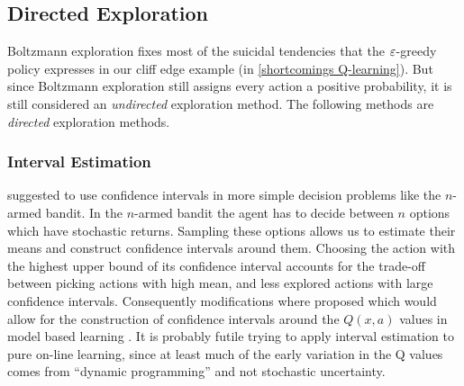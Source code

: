\subsection{Directed Exploration}

Boltzmann exploration fixes most of the suicidal tendencies that the \(\varepsilon\)-greedy policy expresses in our cliff edge example (in \ref{shortcomings Q-learning}). But since Boltzmann exploration still assigns every action a positive probability, it is still considered an \emph{undirected} exploration method. The following methods are \emph{directed} exploration methods.

\subsubsection{Interval Estimation}
\textcite{kaelblingLearningEmbeddedSystems1993} suggested to use confidence intervals in more simple decision problems like the \(n\)-armed bandit. 
In the \(n\)-armed bandit the agent has to decide between \(n\) options which have stochastic returns. Sampling these options allows us to estimate their means and construct confidence intervals around them. Choosing the action with the highest upper bound of its confidence interval accounts for the trade-off between picking actions with high mean, and less explored actions with large confidence intervals. Consequently modifications where proposed which would allow for the construction of confidence intervals around the \(Q(x,a)\) values in model based learning \parencite[e.g.][]{wieringEfficientModelbasedExploration1998,strehlAnalysisModelbasedInterval2008}. It is probably futile trying to apply interval estimation to pure on-line learning, since at least much of the early variation in the Q values comes from ``dynamic programming'' and not stochastic uncertainty. 

